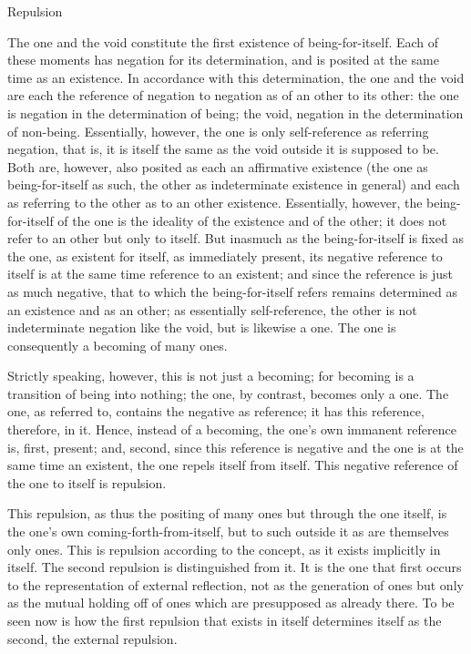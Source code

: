 Repulsion

The one and the void constitute the first existence of being-for-itself.
Each of these moments has negation for its determination,
and is posited at the same time as an existence.
In accordance with this determination,
the one and the void are each the reference
of negation to negation as of an other to its other:
the one is negation in the determination of being; the void,
negation in the determination of non-being.
Essentially, however, the one
is only self-reference as referring negation,
that is, it is itself the same as the
void outside it is supposed to be.
Both are, however, also posited as
each an affirmative existence
(the one as being-for-itself as such,
the other as indeterminate existence in general)
and each as referring to the other as to an other existence.
Essentially, however, the being-for-itself of the one
is the ideality of the existence and of the other;
it does not refer to an other but only to itself.
But inasmuch as the being-for-itself is fixed as the one,
as existent for itself, as immediately present,
its negative reference to itself is
at the same time reference to an existent;
and since the reference is just as much negative,
that to which the being-for-itself refers remains
determined as an existence and as an other;
as essentially self-reference,
the other is not indeterminate negation like the void,
but is likewise a one.
The one is consequently a becoming of many ones.

Strictly speaking, however, this is not just a becoming;
for becoming is a transition of being into nothing;
the one, by contrast, becomes only a one.
The one, as referred to, contains
the negative as reference;
it has this reference, therefore, in it.
Hence, instead of a becoming,
the one's own immanent reference is,
first, present;
and, second, since this reference is negative
and the one is at the same time an existent,
the one repels itself from itself.
This negative reference of
the one to itself is repulsion.

This repulsion, as thus the positing of many ones
but through the one itself, is the one's own coming-forth-from-itself,
but to such outside it as are themselves only ones.
This is repulsion according to the concept,
as it exists implicitly in itself.
The second repulsion is distinguished from it.
It is the one that first occurs to
the representation of external reflection,
not as the generation of ones
but only as the mutual holding off of ones
which are presupposed as already there.
To be seen now is how the first repulsion
that exists in itself determines itself
as the second, the external repulsion.

